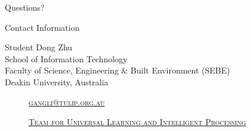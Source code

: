 \documentclass[
 size=14pt,
 paper=smartboard,  %
 mode=present, 		%
 display=slides, 	%
 style=tuliplab,  	%
 pauseslide,
 fleqn,leqno]{powerdot}
\begin{document}
%
\begin{slide}[toc=,bm=]{Questions?}
\begin{center}
\begin{figure}
\end{figure}
\end{center}
\end{slide}


\begin{wideslide}[toc=,bm=]{Contact Information}
\centering
{}
\twocolumn[
lcolwidth=0.35\linewidth,
rcolwidth=0.65\linewidth
]
{
}
{
Student Dong Zhu\\
School of Information Technology\\
Faculty of Science, Engineering & Built Environment (SEBE)\\
Deakin University, Australia
\begin{description}
 \item[\textcolor{orange}{\faEnvelope}] \href{mailto:zhudo@deakin.edu.au}
 {\textsc{\footnotesize{gangli@tulip.org.au}}}

 \item[\textcolor{orange}{\faHome}] \href{http://www.tulip.org.au}
 {\textsc{\footnotesize{Team for Universal Learning and Intelligent Processing}}}
\end{description}
}
\end{wideslide}
\end{document}
